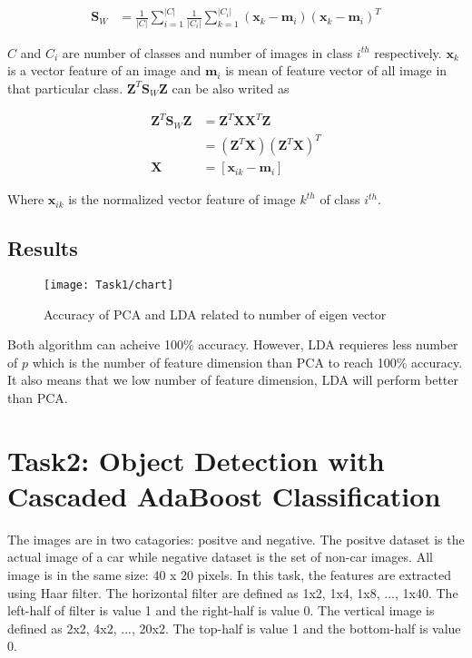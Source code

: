 \documentclass[11pt]{article}
\begin{document}
\begin{align*}
\mathbf{S}_W &= \frac{1}{|C|} \sum_{i=1}^{|C|} \frac{1}{|C_i|} \sum_{k=1}^{|C_i|} (\mathbf{x}_k - \mathbf{m}_i) (\mathbf{x}_k - \mathbf{m}_i)^T
\end{align*}

$C$ and $C_i$ are number of classes and number of images in class $i^{th}$ respectively. $\mathbf{x}_k$ is a vector feature of an image and $\mathbf{m}_i$ is mean of feature vector of all image in that particular class. $\mathbf{Z}^T \mathbf{S}_W \mathbf{Z}$ can be also writed as 

\begin{align*}
\mathbf{Z}^T \mathbf{S}_W \mathbf{Z}  &= \mathbf{Z}^T \mathbf{X} \mathbf{X}^T \mathbf{Z} \\
&= (\mathbf{Z}^T \mathbf{X}) (\mathbf{Z}^T \mathbf{X})^T \\
\mathbf{X} &= [\mathbf{x}_{ik} - \mathbf{m}_i]
\end{align*}

Where $\mathbf{x}_{ik}$ is the normalized vector feature of image $k^{th}$ of class $i^{th}$.

\subsection*{Results}

\begin{figure}[H]
\centering
\texttt{[image: Task1/chart]}
\caption{Accuracy of PCA and LDA related to number of eigen vector}
\label{}
\end{figure}

Both algorithm can acheive 100\% accuracy. However, LDA requieres less number of $p$ which is the number of feature dimension than PCA to reach 100\% accuracy. It also means that we low number of feature dimension, LDA will perform better than PCA.

\section*{Task2: Object Detection with Cascaded AdaBoost Classification}


The images are in two catagories: positve and negative. The positve dataset is the actual image of a car while negative dataset is the set of non-car images. All image is in the same size: 40 x 20 pixels. In this task, the features are extracted using Haar filter. The horizontal filter are defined as 1x2, 1x4, 1x8, ..., 1x40. The left-half of filter is value 1 and the right-half is value 0. The vertical image is defined as 2x2, 4x2, ..., 20x2. The top-half is value 1 and the bottom-half is value 0. 
\end{document}
